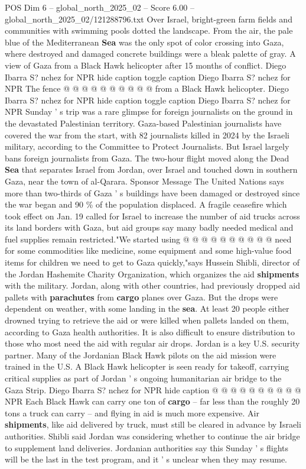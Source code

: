 \begin{textsample}{POS Dim 6 – global\_north\_2025\_02 – Score 6.00 – global\_north\_2025\_02/121288796.txt}
Over Israel, bright-green farm fields and communities with swimming pools dotted the landscape.
From the air, the pale blue of the Mediterranean \textbf{Sea} was the only spot of color crossing into Gaza, where destroyed and damaged concrete buildings were a bleak palette of gray.
A view of Gaza from a Black Hawk helicopter after 15 months of conflict.
Diego Ibarra S? nchez for NPR hide caption toggle caption Diego Ibarra S? nchez for NPR The fence @ @ @ @ @ @ @ @ @ @ from a Black Hawk helicopter.
Diego Ibarra S? nchez for NPR hide caption toggle caption Diego Ibarra S? nchez for NPR Sunday ' s trip was a rare glimpse for foreign journalists on the ground in the devastated Palestinian territory.
Gaza-based Palestinian journalists have covered the war from the start, with 82 journalists killed in 2024 by the Israeli military, according to the Committee to Protect Journalists.
But Israel largely bans foreign journalists from Gaza.
The two-hour flight moved along the Dead \textbf{Sea} that separates Israel from Jordan, over Israel and touched down in southern Gaza, near the town of al-Qarara.
Sponsor Message The United Nations says more than two-thirds of Gaza ' s buildings have been damaged or destroyed since the war began and 90 \% of the population displaced.
A fragile ceasefire which took effect on Jan. 19 called for Israel to increase the number of aid trucks across its land borders with Gaza, but aid groups say many badly needed medical and fuel supplies remain restricted."We started using @ @ @ @ @ @ @ @ @ @ need for some commodities like medicine, some equipment and some high-value food items for children we need to get to Gaza quickly,"says Hussein Shibli, director of the Jordan Hashemite Charity Organization, which organizes the aid \textbf{shipments} with the military.
Jordan, along with other countries, had previously dropped aid pallets with \textbf{parachutes} from \textbf{cargo} planes over Gaza.
But the drops were dependent on weather, with some landing in the \textbf{sea}.
At least 20 people either drowned trying to retrieve the aid or were killed when pallets landed on them, according to Gaza health authorities.
It is also difficult to ensure distribution to those who most need the aid with regular air drops.
Jordan is a key U.S. security partner.
Many of the Jordanian Black Hawk pilots on the aid mission were trained in the U.S.
A Black Hawk helicopter is seen ready for takeoff, carrying critical supplies as part of Jordan ' s ongoing humanitarian air bridge to the Gaza Strip.
Diego Ibarra S? nchez for NPR hide caption @ @ @ @ @ @ @ @ @ @ NPR Each Black Hawk can carry one ton of \textbf{cargo} -- far less than the roughly 20 tons a truck can carry -- and flying in aid is much more expensive.
Air \textbf{shipments}, like aid delivered by truck, must still be cleared in advance by Israeli authorities.
Shibli said Jordan was considering whether to continue the air bridge to supplement land deliveries.
Jordanian authorities say this Sunday ' s flights will be the last in the test program, and it ' s unclear when they may resume.

\end{textsample}
